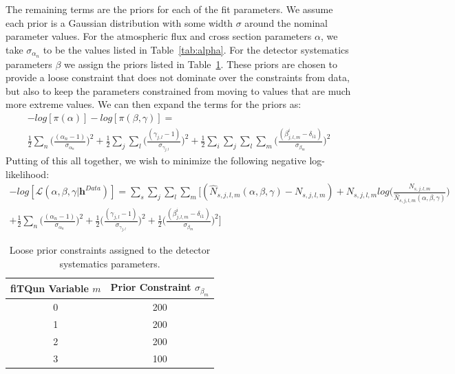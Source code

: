 The remaining terms are the priors for each of the fit parameters.  We assume
each prior is a Gaussian distribution with some width $\sigma$ around the
nominal parameter values.  For the atmospheric flux and cross section
parameters $\alpha$, we take $\sigma_{\alpha_{n}}$ to be the values listed in
Table~\ref{tab:alpha}.  For the detector systematics parameters $\beta$ we
assign the priors listed in Table~\ref{tab:betaprior}.  These priors are
chosen to provide a loose constraint that does not dominate over the
constraints from data, but also to keep the parameters constrained from moving
to values that are much more extreme values.  We can then expand
the terms for the priors as:
%
\begin{gather*}
  \label{eq:logpriors}
  - log[\pi(\alpha)] - log[\pi(\beta,\gamma)] = \\ \frac{1}{2}
  \sum\limits_{n}^{} \bigg(\frac{(\alpha_{n} - 1)}{\sigma_{\alpha_{n}}}\bigg)^{2} +
   \frac{1}{2} \sum\limits_{j}^{} \sum\limits_{l}^{} 
  \bigg(\frac{(\gamma_{j,l} - 1)}{\sigma_{\gamma_{j,l}}}\bigg)^{2} + 
   \frac{1}{2} \sum\limits_{i}^{} \sum\limits_{j}^{} \sum\limits_{l}^{} \sum\limits_{m}^{}
  \bigg(\frac{(\beta_{j,l,m}^{i} - \delta_{i1})}{\sigma_{\beta_{m}}}\bigg)^{2}  
\end{gather*}
%
Putting of this all together, we wish to minimize the following negative log-likelihood:
%
\begin{equation}
 \begin{gathered}
  \label{eq:likefull}
  -log[\mathcal{L}(\alpha,\beta,\gamma | \mathbf{h}^{Data}  )] =
  \sum\limits_{s}^{} \sum\limits_{j}^{} \sum\limits_{l}^{} \sum\limits_{m}^{}
  \bigg[ (\hat{N}_{s,j,l,m}(\alpha,\beta,\gamma) - N_{s,j,l,m})
    + N_{s,j,l,m}log\bigg(\frac{N_{s,j,l,m}}{\hat{N}_{s,j,l,m}(\alpha,\beta,\gamma)}\bigg) \\
  +\frac{1}{2} \sum\limits_{n}^{} \bigg(\frac{(\alpha_{n} - 1)}{\sigma_{\alpha_{n}}}\bigg)^{2}
  + \frac{1}{2}\bigg(\frac{(\gamma_{j,l} - 1)}{\sigma_{\gamma_{j,l}}}\bigg)^{2} 
  + \frac{1}{2}\bigg(\frac{(\beta_{j,l,m}^{i} - \delta_{i1})}{\sigma_{\beta_{m}}}\bigg)^{2} \bigg] 
 \end{gathered}
\end{equation}


\begin{table}[h]
  \centering
  \begin{tabular}{c|c}
   \hline\hline
   fiTQun Variable $m$ & Prior Constraint $\sigma_{\beta_{m}}$ \\
   \hline\hline
   0 & 200 \\
   1 & 200 \\
   2 & 200 \\
   3 & 100 \\
   \hline\hline
  \end{tabular}
  \caption{Loose prior constraints assigned to the detector systematics parameters.}
  \label{tab:betaprior}
\end{table}




